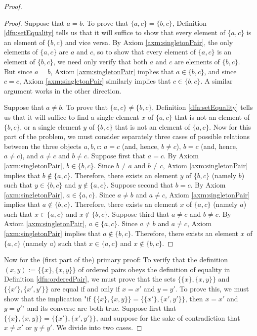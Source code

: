 \documentclass[../main.tex]{subfiles}
\begin{document}
\begin{enumerate}[ref={\thesection.\arabic*}]
\begin{proof}
\begin{lem}
\begin{proof}
                Suppose that $a=b$. To prove that $\{a,c\}=\{b,c\}$, Definition \ref{dfn:setEquality} tells us that it will suffice to show that every element of $\{a,c\}$ is an element of $\{b,c\}$ and vice versa. By Axiom \ref{axm:singletonPair}, the only elements of $\{a,c\}$ are $a$ and $c$, so to show that every element of $\{a,c\}$ is an element of $\{b,c\}$, we need only verify that both $a$ and $c$ are elements of $\{b,c\}$. But since $a=b$, Axiom \ref{axm:singletonPair} implies that $a\in\{b,c\}$, and since $c=c$, Axiom \ref{axm:singletonPair} similarly implies that $c\in\{b,c\}$. A similar argument works in the other direction.\par
                Suppose that $a\neq b$. To prove that $\{a,c\}\neq\{b,c\}$, Definition \ref{dfn:setEquality} tells us that it will suffice to find a single element $x$ of $\{a,c\}$ that is not an element of $\{b,c\}$, or a single element $y$ of $\{b,c\}$ that is not an element of $\{a,c\}$. Now for this part of the problem, we must consider separately three cases of possible relations between the three objects $a,b,c$: $a=c$ (and, hence, $b\neq c$), $b=c$ (and, hence, $a\neq c$), and $a\neq c$ and $b\neq c$. Suppose first that $a=c$. By Axiom \ref{axm:singletonPair}, $b\in\{b,c\}$. Since $b\neq a$ and $b\neq c$, Axiom \ref{axm:singletonPair} implies that $b\notin\{a,c\}$. Therefore, there exists an element $y$ of $\{b,c\}$ (namely $b$) such that $y\in\{b,c\}$ and $y\notin\{a,c\}$. Suppose second that $b=c$. By Axiom \ref{axm:singletonPair}, $a\in\{a,c\}$. Since $a\neq b$ and $a\neq c$, Axiom \ref{axm:singletonPair} implies that $a\notin\{b,c\}$. Therefore, there exists an element $x$ of $\{a,c\}$ (namely $a$) such that $x\in\{a,c\}$ and $x\notin\{b,c\}$. Suppose third that $a\neq c$ and $b\neq c$. By Axiom \ref{axm:singletonPair}, $a\in\{a,c\}$. Since $a\neq b$ and $a\neq c$, Axiom \ref{axm:singletonPair} implies that $a\notin\{b,c\}$. Therefore, there exists an element $x$ of $\{a,c\}$ (namely $a$) such that $x\in\{a,c\}$ and $x\notin\{b,c\}$.
            \end{proof}
        \end{lem}
        Now for the (first part of the) primary proof: To verify that the definition $(x,y):=\{\{x\},\{x,y\}\}$ of ordered pairs obeys the definition of equality in Definition \ref{dfn:orderedPair}, we must prove that the sets $\{\{x\},\{x,y\}\}$ and $\{\{x'\},\{x',y'\}\}$ are equal if and only if $x=x'$ and $y=y'$. To prove this, we must show that the implication "if $\{\{x\},\{x,y\}\}=\{\{x'\},\{x',y'\}\}$, then $x=x'$ and $y=y'$" and its converse are both true. Suppose first that $\{\{x\},\{x,y\}\}=\{\{x'\},\{x',y'\}\}$, and suppose for the sake of contradiction that $x\neq x'$ or $y\neq y'$. We divide into two cases.

\end{proof}
\end{enumerate}
\end{document}
